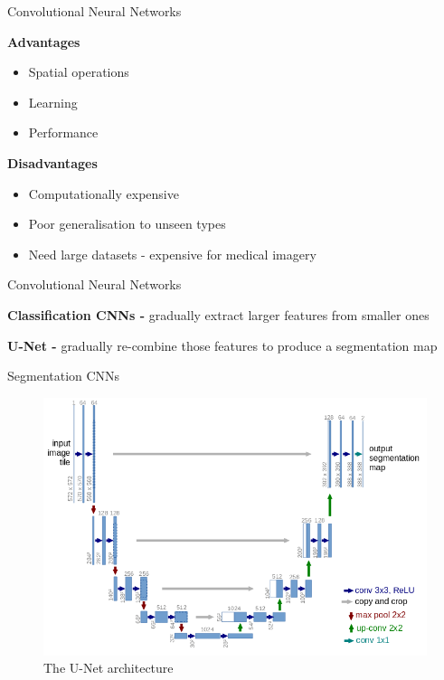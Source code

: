 \documentclass[10pt]{beamer}
\begin{document}
\begin{frame}[fragile]{Convolutional Neural Networks}

  \textbf{Advantages}
  \begin{itemize}
  \item Spatial operations
  \item Learning
  \item Performance
  \end{itemize}

  \textbf{Disadvantages}
  \begin{itemize}
  \item Computationally expensive
  \item Poor generalisation to unseen types
  \item Need large datasets - expensive for medical imagery
  \end{itemize}
  
\end{frame}

\begin{frame}[fragile]{Convolutional Neural Networks}

  \textbf{Classification CNNs -} gradually extract larger features from smaller ones

  \pause
  \textbf{U-Net -} gradually re-combine those features to produce a segmentation map
  
\end{frame}


\begin{frame}[fragile]{Segmentation CNNs}

  \begin{figure}[h!]
    \centering
    \includegraphics[scale=0.40]{pictures/U-Net}
    \caption{The U-Net architecture}
    \label{fig:minCut}
  \end{figure}
  
\end{frame}
\end{document}
